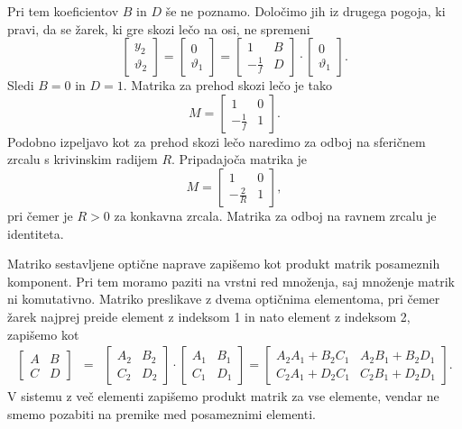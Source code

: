 Pri tem koeficientov $B$ in $D$ še ne poznamo. Določimo jih iz drugega pogoja, 
ki pravi, da se žarek, ki gre skozi lečo na osi, ne spremeni
\begin{equation}
\left[\begin{array}{c}
y_{2}\\
\vartheta_{2}
\end{array}\right]=\left[\begin{array}{c}
0\\
\vartheta_{1}
\end{array}\right]=\left[\begin{array}{cc}
1 & B\\
-\frac{1}{f} & D
\end{array}\right]\cdot\left[\begin{array}{c}
0\\
\vartheta_{1}
\end{array}\right].
\end{equation}
 Sledi $B=0$ in $D=1$. Matrika za prehod skozi lečo je tako 
\begin{equation}
M= \left[\begin{array}{cc}
1 & 0\\
-\frac{1}{f} & 1
\end{array}\right].
\label{eq:MABCD2}
\end{equation}
Podobno izpeljavo kot za prehod skozi lečo naredimo za odboj na sferičnem zrcalu
s krivinskim radijem $R$. Pripadajoča matrika je 
\begin{equation}
M=\left[\begin{array}{cc}
1 & 0\\
-\frac{2}{R} & 1
\end{array}\right],
\end{equation}
pri čemer je $R>0$ za konkavna zrcala. Matrika za odboj na ravnem zrcalu je identiteta.

Matriko sestavljene optične naprave zapišemo kot produkt matrik posameznih komponent. 
Pri tem moramo paziti na vrstni red množenja, saj množenje matrik ni komutativno.
Matriko preslikave z dvema optičnima elementoma, pri čemer žarek 
najprej preide element z indeksom 1 in nato element z indeksom 2, zapišemo kot 
\begin{eqnarray}
\left[\begin{array}{cc}
A & B\\
C & D
\end{array}\right] & = & \left[\begin{array}{cc}
A_{2} & B_{2}\\
C_{2} & D_{2}
\end{array}\right]\cdot\left[\begin{array}{cc}
A_{1} & B_{1}\\
C_{1} & D_{1}
\end{array}\right]=\left[\begin{array}{cc}
A_{2}A_{1}+B_{2}C_{1} & A_{2}B_{1}+B_{2}D_{1}\\
C_{2}A_{1}+D_{2}C_{1} & C_{2}B_{1}+D_{2}D_{1}
\end{array}\right].
\end{eqnarray}
V sistemu z več elementi zapišemo produkt matrik za vse elemente, 
vendar ne smemo pozabiti na premike med posameznimi elementi.

